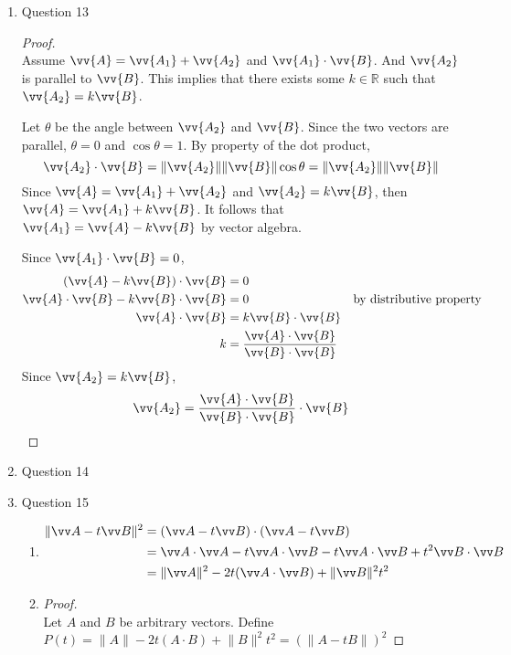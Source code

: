 \documentclass[11pt]{article}
\def\R {{\mathbb R}}
\newcommand{\norm}[1]{\lVert #1 \rVert}
\begin{document}
\begin{enumerate}
    \item Question 13
    
    \begin{proof}
    \hfill \\
    Assume $\vv{A}=\vv{A_1}+\vv{A_2}$ and $\vv{A_1}\cdot \vv{B}$. And $\vv{A_2}$ is parallel to $\vv{B}$. This implies that there exists some $k\in\R$ such that $\vv{A_2} = k\vv{B}$.
    
    Let $\theta$ be the angle between $\vv{A_2}$ and $\vv{B}$. Since the two vectors are parallel, $\theta=0$ and $\cos\theta=1$. By property of the dot product, 
    $$
    \vv{A_2}\cdot\vv{B}=\norm{\vv{A_2}}\norm{\vv{B}}\cos\theta = \norm{\vv{A_2}}\norm{\vv{B}}
    $$
    Since $\vv{A}=\vv{A_1}+\vv{A_2}$ and $\vv{A_2} = k\vv{B}$, then $\vv{A}=\vv{A_1}+k\vv{B}$. It follows that $\vv{A_1}=\vv{A}-k\vv{B}$ by vector algebra.
    
    Since $\vv{A_1}\cdot\vv{B}=0$,
    \begin{align*}
        (\vv{A}-k\vv{B})\cdot \vv{B} &= 0 \\
        \vv{A}\cdot\vv{B}-k\vv{B}\cdot\vv{B} &= 0  & \text{by distributive property}\\
        \vv{A}\cdot\vv{B} &= k\vv{B}\cdot\vv{B} \\
        k &= \frac{\vv{A}\cdot\vv{B}}{\vv{B}\cdot\vv{B}}
    \end{align*}
    Since $\vv{A_2} = k\vv{B}$,
    $$
    \vv{A_2} = \frac{\vv{A}\cdot\vv{B}}{\vv{B}\cdot\vv{B}} \cdot \vv{B}
    $$
    \end{proof}
    
    \item Question 14
    
    \item Question 15
    \begin{enumerate}
        \item     
        \begin{align*}
            \norm{\vv A - t\vv B}^2 &= (\vv A - t\vv B)\cdot (\vv A - t \vv B) \\
            &= \vv A \cdot \vv A - t\vv A \cdot \vv B - t \vv A \cdot \vv B + t^2\vv B \cdot \vv B \\
            &= \norm{\vv A}^2 -2t(\vv A \cdot \vv B) + \norm{\vv B}^2t^2
        \end{align*}
        
        \item
        \hfill
        \begin{proof}
            \hfill \\
            Let $A$ and $B$ be arbitrary vectors.
            Define $P(t)=\norm{A}-2t(A\cdot B)+\norm{B}^2t^2 = (\norm{A-tB})^2$
            

\end{proof}
\end{enumerate}
\end{enumerate}
\end{document}
